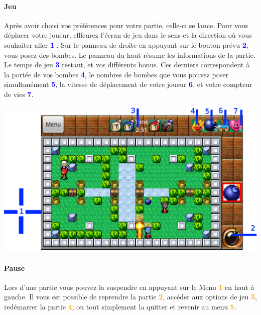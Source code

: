 	\paragraph{Jeu\\}
	Après avoir choisi vos préférences pour votre partie, celle-ci se lance.
	Pour vous déplacer votre joueur, effleurez l'écran de jeu dans le sens et la
	direction où vous souhaiter aller \textcolor{blue}{\textbf{1}} .	
	Sur le panneau de droite en appuyant sur le
	bouton prévu \textcolor{blue}{\textbf{2}}, vous posez des bombes.
	Le panneau du haut résume les informations de la partie. Le temps de jeu
	\textcolor{blue}{\textbf{3}} restant, et vos différents bonus. Ces derniers
	correspondent à la portée de vos bombes \textcolor{blue}{\textbf{4}}, le
	nombres de bombes que vous pouvez poser
	simultanément \textcolor{blue}{\textbf{5}}, la vitesse de déplacement de votre
	joueur \textcolor{blue}{\textbf{6}}, et votre compteur de vies
	\textcolor{blue}{\textbf{7}}.
	
	\begin{center}
		\includegraphics[scale=0.6]{Manuel/Img/21.eps}
	\end{center}
	
	\paragraph{Pause\\}
	Lors d'une partie vous pouvez la suspendre en appuyant sur le Menu
	\textcolor{orange}{\textbf{1}} en haut à gauche. Il vous est possible de
	reprendre la partie \textcolor{orange}{\textbf{2}}, accéder aux options de jeu
	\textcolor{orange}{\textbf{3}}, redémarrer la partie
	\textcolor{orange}{\textbf{4}}, ou tout simplement la quitter et revenir au
	menu \textcolor{orange}{\textbf{5}}. 
	
